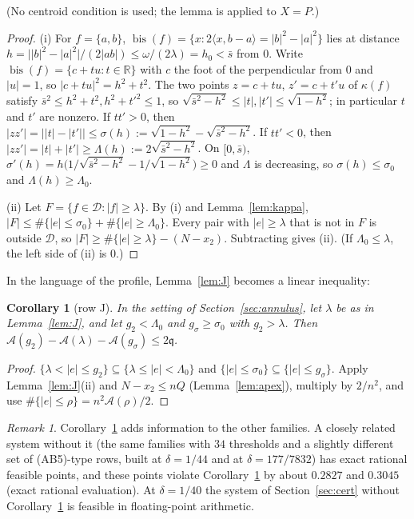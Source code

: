 \documentclass[11pt]{article}
\newcommand{\R}{\mathbb{R}}
\newcommand{\cA}{\mathcal{A}}
\newcommand{\cD}{\mathcal{D}}
\newcommand{\qq}{\mathfrak{q}}
\newcommand{\sbar}{\bar{s}}
\newcommand{\bis}{\operatorname{bis}}
\newtheorem{corollary}[theorem]{Corollary}
\theoremstyle{remark}
\newtheorem{remark}[theorem]{Remark}
\begin{document}
(No centroid condition is used; the lemma is applied to $X = P$.)

\begin{proof}
(i) For $f = \{a,b\}$, $\bis(f) = \{x : 2\langle x, b - a\rangle = |b|^2 -
|a|^2\}$ lies at distance $h = \bigl||b|^2 - |a|^2\bigr|/(2|ab|) \le
\omega/(2\lambda) = h_0 < \sbar$ from $0$. Write $\bis(f) = \{c + tu : t \in
\R\}$ with $c$ the foot of the perpendicular from $0$ and $|u| = 1$, so
$|c + tu|^2 = h^2 + t^2$. The two points $z = c + tu$, $z' = c + t'u$ of
$\kappa(f)$ satisfy $\sbar^2 \le h^2 + t^2, h^2 + t'^2 \le 1$, so
$\sqrt{\sbar^2 - h^2} \le |t|, |t'| \le \sqrt{1-h^2}$; in particular $t$ and
$t'$ are nonzero. If $tt' > 0$, then $|zz'| = \bigl||t| - |t'|\bigr| \le
\sigma(h) := \sqrt{1-h^2} - \sqrt{\sbar^2 - h^2}$. If $tt' < 0$, then
$|zz'| = |t| + |t'| \ge \Lambda(h) := 2\sqrt{\sbar^2 - h^2}$. On $[0,\sbar)$,
$\sigma'(h) = h\bigl(1/\sqrt{\sbar^2 - h^2} - 1/\sqrt{1 - h^2}\bigr) \ge 0$
and $\Lambda$ is decreasing, so $\sigma(h) \le \sigma_0$ and
$\Lambda(h) \ge \Lambda_0$.

(ii) Let $F = \{f \in \cD : |f| \ge \lambda\}$. By (i) and
Lemma~\ref{lem:kappa}, $|F| \le \#\{|e| \le \sigma_0\} + \#\{|e| \ge
\Lambda_0\}$. Every pair with $|e| \ge \lambda$ that is not in $F$ is
outside $\cD$, so $|F| \ge \#\{|e| \ge \lambda\} - (N - x_2)$. Subtracting
gives (ii). (If $\Lambda_0 \le \lambda$, the left side of (ii) is $0$.)
\end{proof}

In the language of the profile, Lemma~\ref{lem:J} becomes a linear
inequality:

\begin{corollary}[row J]\label{cor:J}
In the setting of Section~\ref{sec:annulus}, let $\lambda$ be as in
Lemma~\ref{lem:J}, and let $g_2 < \Lambda_0$ and $g_\sigma \ge \sigma_0$ with
$g_2 > \lambda$. Then $\cA(g_2) - \cA(\lambda) - \cA(g_\sigma) \le 2\qq$.
\end{corollary}

\begin{proof}
$\{\lambda < |e| \le g_2\} \subseteq \{\lambda \le |e| < \Lambda_0\}$ and
$\{|e| \le \sigma_0\} \subseteq \{|e| \le g_\sigma\}$. Apply
Lemma~\ref{lem:J}(ii) and $N - x_2 \le nQ$ (Lemma~\ref{lem:apex}), multiply
by $2/n^2$, and use $\#\{|e|\le\rho\} = n^2\cA(\rho)/2$.
\end{proof}

\begin{remark}
Corollary~\ref{cor:J} adds information to the other families. A closely
related system without it (the same families with $34$ thresholds and a
slightly different set of (AB5)-type rows, built at $\delta = 1/44$ and at
$\delta = 177/7832$) has exact rational feasible points, and these points
violate Corollary~\ref{cor:J} by about $0.2827$ and $0.3045$ (exact
rational evaluation). At $\delta = 1/40$ the system of
Section~\ref{sec:cert} without Corollary~\ref{cor:J} is feasible in
floating-point arithmetic.
\end{remark}
\end{document}
